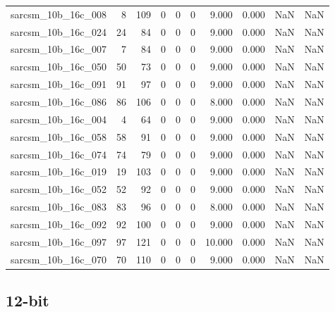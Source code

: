 \documentclass{article}
\begin{document}
\begin{longtable}{lrrrrrrrrr}
sarcsm\_10b\_16c\_008 & 8 & 109 & 0 & 0 & 0 & 9.000 & 0.000 & NaN & NaN \\
sarcsm\_10b\_16c\_024 & 24 & 84 & 0 & 0 & 0 & 9.000 & 0.000 & NaN & NaN \\
sarcsm\_10b\_16c\_007 & 7 & 84 & 0 & 0 & 0 & 9.000 & 0.000 & NaN & NaN \\
sarcsm\_10b\_16c\_050 & 50 & 73 & 0 & 0 & 0 & 9.000 & 0.000 & NaN & NaN \\
sarcsm\_10b\_16c\_091 & 91 & 97 & 0 & 0 & 0 & 9.000 & 0.000 & NaN & NaN \\
sarcsm\_10b\_16c\_086 & 86 & 106 & 0 & 0 & 0 & 8.000 & 0.000 & NaN & NaN \\
sarcsm\_10b\_16c\_004 & 4 & 64 & 0 & 0 & 0 & 9.000 & 0.000 & NaN & NaN \\
sarcsm\_10b\_16c\_058 & 58 & 91 & 0 & 0 & 0 & 9.000 & 0.000 & NaN & NaN \\
sarcsm\_10b\_16c\_074 & 74 & 79 & 0 & 0 & 0 & 9.000 & 0.000 & NaN & NaN \\
sarcsm\_10b\_16c\_019 & 19 & 103 & 0 & 0 & 0 & 9.000 & 0.000 & NaN & NaN \\
sarcsm\_10b\_16c\_052 & 52 & 92 & 0 & 0 & 0 & 9.000 & 0.000 & NaN & NaN \\
sarcsm\_10b\_16c\_083 & 83 & 96 & 0 & 0 & 0 & 8.000 & 0.000 & NaN & NaN \\
sarcsm\_10b\_16c\_092 & 92 & 100 & 0 & 0 & 0 & 9.000 & 0.000 & NaN & NaN \\
sarcsm\_10b\_16c\_097 & 97 & 121 & 0 & 0 & 0 & 10.000 & 0.000 & NaN & NaN \\
sarcsm\_10b\_16c\_070 & 70 & 110 & 0 & 0 & 0 & 9.000 & 0.000 & NaN & NaN \\
\end{longtable}

\subsection*{12-bit}
\end{document}

